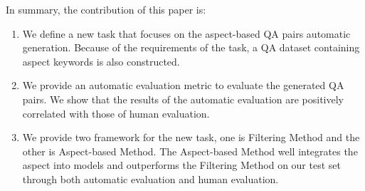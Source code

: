 In summary, the contribution of this paper is:
\begin{enumerate}
\item We define a new task that focuses on the aspect-based QA pairs automatic generation.  Because of the requirements of the task, a QA dataset containing aspect keywords is also constructed.
\item We provide an automatic evaluation metric to evaluate the generated QA pairs. 
We show that the results of the automatic evaluation are positively correlated with those of human evaluation.
\item We provide two framework for the new task, one is Filtering Method and the other is Aspect-based Method. The Aspect-based Method well integrates the aspect into models and outperforms the Filtering Method on our test set through both automatic evaluation and human evaluation.
\end{enumerate}

 
